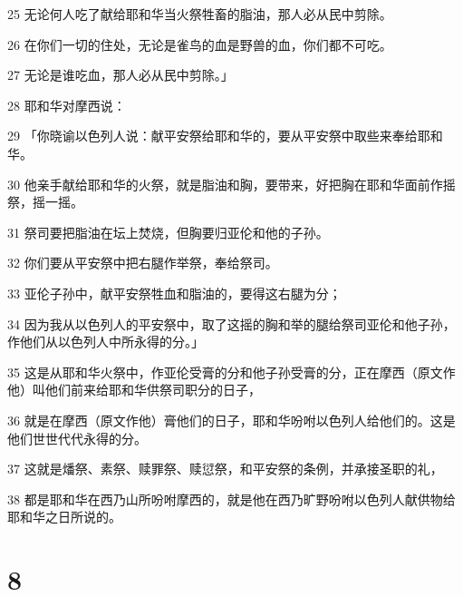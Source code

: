 \par 25 无论何人吃了献给耶和华当火祭牲畜的脂油，那人必从民中剪除。
\par 26 在你们一切的住处，无论是雀鸟的血是野兽的血，你们都不可吃。
\par 27 无论是谁吃血，那人必从民中剪除。」
\par 28 耶和华对摩西说：
\par 29 「你晓谕以色列人说：献平安祭给耶和华的，要从平安祭中取些来奉给耶和华。
\par 30 他亲手献给耶和华的火祭，就是脂油和胸，要带来，好把胸在耶和华面前作摇祭，摇一摇。
\par 31 祭司要把脂油在坛上焚烧，但胸要归亚伦和他的子孙。
\par 32 你们要从平安祭中把右腿作举祭，奉给祭司。
\par 33 亚伦子孙中，献平安祭牲血和脂油的，要得这右腿为分；
\par 34 因为我从以色列人的平安祭中，取了这摇的胸和举的腿给祭司亚伦和他子孙，作他们从以色列人中所永得的分。」
\par 35 这是从耶和华火祭中，作亚伦受膏的分和他子孙受膏的分，正在摩西（原文作他）叫他们前来给耶和华供祭司职分的日子，
\par 36 就是在摩西（原文作他）膏他们的日子，耶和华吩咐以色列人给他们的。这是他们世世代代永得的分。
\par 37 这就是燔祭、素祭、赎罪祭、赎愆祭，和平安祭的条例，并承接圣职的礼，
\par 38 都是耶和华在西乃山所吩咐摩西的，就是他在西乃旷野吩咐以色列人献供物给耶和华之日所说的。

\chapter{8}

